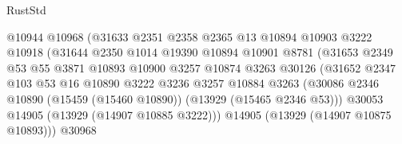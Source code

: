 \begin{lexlean}{RustStd}
\begin{coremodule}
                                      @10944
                                      @10968
                                      (@31633
                                        @2351
                                        @2358
                                        @2365
                                        @13
                                        @10894
                                        @10903
                                        @3222
                                        @10918
                                        (@31644
                                          @2350
                                          @1014
                                          @19390
                                          @10894
                                          @10901
                                          @8781
                                          (@31653
                                            @2349
                                            @53
                                            @55
                                            @3871
                                            @10893
                                            @10900
                                            @3257
                                            @10874
                                            @3263
                                            @30126
                                            (@31652
                                              @2347
                                              @103
                                              @53
                                              @16
                                              @10890
                                              @3222
                                              @3236
                                              @3257
                                              @10884
                                              @3263
                                              (@30086
                                                @2346
                                                @10890
                                                (@15459 (@15460 @10890))
                                                (@13929 (@15465 @2346 @53)))
                                              @30053
                                              @14905
                                              (@13929 (@14907 @10885 @3222)))
                                            @14905
                                            (@13929 (@14907 @10875 @10893)))
                                          @30968

\end{coremodule}
\end{lexlean}

